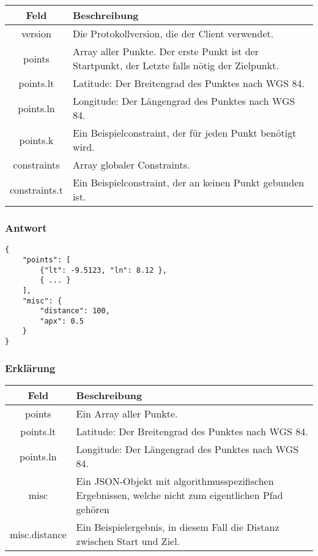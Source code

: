 \documentclass[ngerman,titlepage,parskip=true]{scrartcl}
\begin{document}
	    \noindent \begin{tabular}{|c|p{12cm}|}
	    	\hline
	    	\textbf{Feld} & \textbf{Beschreibung} \\ 
	    	\hline \hline
	    	
	    	version & Die Protokollversion, die der Client verwendet.\\
	    	\hline
	    	
	    	points & Array aller Punkte. Der erste Punkt ist der Startpunkt, der Letzte falls nötig der Zielpunkt. \\ 
	    	\hline
	    	
	    	points.lt & Latitude: Der Breitengrad des Punktes nach WGS 84. \\ 
	    	\hline
	    	
	    	points.ln & Longitude: Der Längengrad des Punktes nach WGS 84. \\
	    	\hline
	    	
	    	points.k & Ein Beispielconstraint, der für jeden Punkt benötigt wird.\\ 
	    	\hline
	    	
	    	constraints & Array globaler Constraints.\\ 
	    	\hline
	    	
	    	constraints.t & Ein Beispielconstraint, der an keinen Punkt gebunden ist.\\ 
	    	\hline
	    \end{tabular}
    
    \subsubsection{Antwort}	
	\begin{lstlisting}
{
	"points": [
		{"lt": -9.5123, "ln": 8.12 },
		{ ... }
	],
	"misc": {
		"distance": 100,
		"apx": 0.5
	}
}
	\end{lstlisting}
	
		\subsubsection*{Erklärung}
		
		\begin{tabular}{|c|p{12cm}|}
			\hline
			\textbf{Feld} & \textbf{Beschreibung} \\ 
			\hline \hline
			
			points & Ein Array aller Punkte.\\
			\hline
			
	    	points.lt & Latitude: Der Breitengrad des Punktes nach WGS 84. \\ 
	    	\hline
	    	
	    	points.ln & Longitude: Der Längengrad des Punktes nach WGS 84. \\
	    	\hline
	    	
	    	misc & Ein JSON-Objekt mit algorithmusspezifischen Ergebnissen, welche nicht zum eigentlichen Pfad gehören \\
	    	\hline
	    	
	    	misc.distance & Ein Beispielergebnis, in diesem Fall die Distanz zwischen Start und Ziel.\\
	    	\hline
		\end{tabular}
\end{document}
